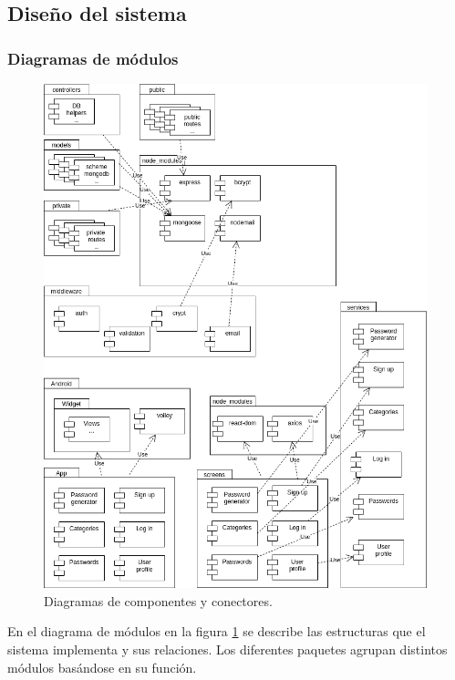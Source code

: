 \documentclass{article}
\begin{document}
\subsection{Diseño del sistema}



\subsubsection*{Diagramas de módulos}

\begin{figure}[H]
    \centering
        \includegraphics[width=0.99\textwidth]{../images/modulos_v1.png}
    \caption{Diagramas de componentes y conectores.}
    \label{modulos}
\end{figure}
\pagebreak

En el diagrama de módulos en la figura \ref{modulos} se describe las estructuras que el sistema implementa y sus relaciones. Los diferentes paquetes agrupan distintos módulos basándose en su función.
\end{document}
